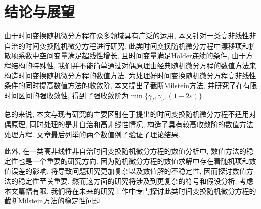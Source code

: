 

\chapter{结论与展望}

 由于时间变换随机微分方程在众多领域具有广泛的运用, 本文针对一类高非线性非自治的时间变换随机微分方程进行研究. 此类时间变换随机微分方程中漂移项和扩散项系数中空间变量满足超线性增长, 且时间变量满足H{\"o}lder连续的条件, 由于方程结构的特殊性, 我们并不能简单通过对偶原理由经典随机微分方程的数值方法来构造时间变换随机微分方程的数值方法. 为处理好时间变换随机微分方程高非线性条件的同时提高数值方法的收敛阶, 本文提出了截断Milstein方法, 并研究了在有限时间区间的强收敛性, 得到了强收敛阶为${\min\{\gamma_f,\gamma_g,(1-2\varepsilon)\}}$.

总的来说, 本文与现有研究的主要区别在于提出的时间变换随机微分方程不适用对偶原理, 同时处理的是非自治和高非线性情况, 构造了具有较高收敛阶的数值方法处理方程. 文章最后列举的两个数值例子验证了理论结果. 
\par
此外, 在一类高非线性非自治时间变换随机微分方程的数值分析中, 数值方法的稳定性也是一个重要的研究方向. 因为随机微分方程的数值求解中存在着随机项和数值误差的影响, 将导致问题研究更加复杂以及数值解的不稳定性, 因而探讨数值方法的稳定性至关重要. 然而这方面的研究将涉及到更复杂的符号和假设分析. 考虑本文篇幅有限, 我们将在未来的研究工作中专门探讨此类时间变换随机微分方程的截断Milstein方法的稳定性问题.